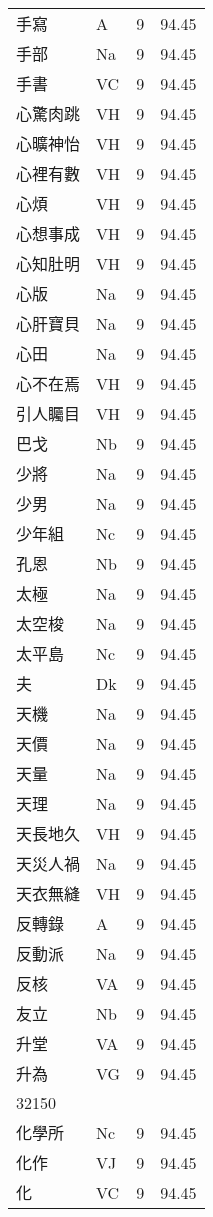 \documentclass[twocolumn]{book}
\begin{document}
\begin{supertabular}{llrr}
手寫 & A & 9 &  94.45\\
手部 & Na & 9 &  94.45\\
手書 & VC & 9 &  94.45\\
心驚肉跳 & VH & 9 &  94.45\\
心曠神怡 & VH & 9 &  94.45\\
心裡有數 & VH & 9 &  94.45\\
心煩 & VH & 9 &  94.45\\
心想事成 & VH & 9 &  94.45\\
心知肚明 & VH & 9 &  94.45\\
心版 & Na & 9 &  94.45\\
心肝寶貝 & Na & 9 &  94.45\\
心田 & Na & 9 &  94.45\\
心不在焉 & VH & 9 &  94.45\\
引人矚目 & VH & 9 &  94.45\\
巴戈 & Nb & 9 &  94.45\\
少將 & Na & 9 &  94.45\\
少男 & Na & 9 &  94.45\\
少年組 & Nc & 9 &  94.45\\
孔恩 & Nb & 9 &  94.45\\
太極 & Na & 9 &  94.45\\
太空梭 & Na & 9 &  94.45\\
太平島 & Nc & 9 &  94.45\\
夫 & Dk & 9 &  94.45\\
天機 & Na & 9 &  94.45\\
天價 & Na & 9 &  94.45\\
天量 & Na & 9 &  94.45\\
天理 & Na & 9 &  94.45\\
天長地久 & VH & 9 &  94.45\\
天災人禍 & Na & 9 &  94.45\\
天衣無縫 & VH & 9 &  94.45\\
反轉錄 & A & 9 &  94.45\\
反動派 & Na & 9 &  94.45\\
反核 & VA & 9 &  94.45\\
友立 & Nb & 9 &  94.45\\
升堂 & VA & 9 &  94.45\\
升為 & VG & 9 &  94.45\\
32150\\
化學所 & Nc & 9 &  94.45\\
化作 & VJ & 9 &  94.45\\
化 & VC & 9 &  94.45\\

\end{supertabular}
\end{document}
